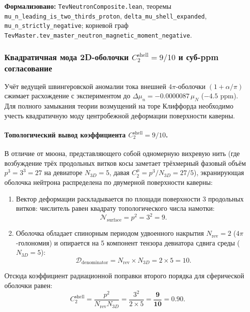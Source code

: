 \documentclass[11pt,a4paper]{article}
\theoremstyle{definition}
\theoremstyle{remark}
\begin{document}
\noindent\small\textbf{Формализовано:} \texttt{TevNeutronComposite.lean}, теоремы \texttt{mu\_n\_leading\_is\_two\_thirds\_proton}, \texttt{delta\_mu\_shell\_expanded}, \texttt{mu\_n\_strictly\_negative}; корневой граф \texttt{TevMaster.tev\_master\_neutron\_magnetic\_moment\_negative}.

\subsubsection{Квадратичная мода 2D-оболочки $C_2^{\mathrm{shell}} = 9/10$ и суб-ppm согласование}
\label{subsubsec:neutron_order2_precision}

Учёт ведущей швингеровской аномалии тока внешней $4\pi$-оболочки $(1 + \alpha/\pi)$ сжимает расхождение с экспериментом до $\Delta \mu_n = -0.0000087\,\mu_N$ ($-4.5\text{ ppm}$). Для полного замыкания теории возмущений на торе Клиффорда необходимо учесть квадратичную моду центробежной деформации поверхности каверны.

\paragraph{Топологический вывод коэффициента $C_2^{\mathrm{shell}} = 9/10$.}
В отличие от мюона, представляющего собой одномерную вихревую нить (где возбуждение трёх продольных витков косы заметает трёхмерный фазовый объём $p^3 = 3^3 = 27$ на девиаторе $N_{3D} = 5$, давая $C_2^\mu = p^3/N_{3D} = 27/5$), экранирующая оболочка нейтрона распределена по двумерной поверхности каверны:
\begin{enumerate}
    \item Вектор деформации раскладывается по площади поверхности 3 продольных витков: числитель равен квадрату топологического числа намотки:
    \begin{equation}
    \mathcal{N}_{\mathrm{surface}} = p^2 = 3^2 = 9.
    \end{equation}
    \item Оболочка обладает спинорным периодом удвоенного накрытия $N_{\mathrm{rev}} = 2$ ($4\pi$-голономия) и опирается на 5 компонент тензора девиатора сдвига среды ($N_{3D} = 5$):
    \begin{equation}
    \mathcal{D}_{\mathrm{denominator}} = N_{\mathrm{rev}} \times N_{3D} = 2 \times 5 = 10.
    \end{equation}
\end{enumerate}
Отсюда коэффициент радиационной поправки второго порядка для сферической оболочки равен:
\begin{equation}
C_2^{\mathrm{shell}} = \frac{p^2}{N_{\mathrm{rev}} N_{3D}} = \frac{3^2}{2 \times 5} = \mathbf{\frac{9}{10} = 0.90}.
\end{equation}
\end{document}
